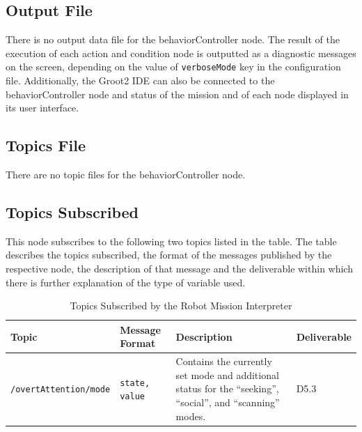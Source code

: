 \documentclass{CSSRforAfrica}
\begin{document}
\subsection{Output File}

There is no output data file for the behaviorController node. The result of the execution of each action and condition node is outputted as a diagnostic messages on the screen, depending on the value of \texttt{\small verboseMode} key in the configuration file.
Additionally, the Groot2 IDE can also be connected to the behaviorController node and status of the mission and of each node displayed in its user interface.

\subsection{Topics File}
There are no topic files for the behaviorController node.

\newpage
\subsection{Topics Subscribed}
This node subscribes to the following two topics listed in the table. The table describes the topics subscribed, the format of the messages published by the respective node, the description of that message and the deliverable within which there is further explanation of the type of variable used.

\begin{longtable}[c]{|l|p{3cm}|p{4.4cm}|l|}
    \caption{Topics Subscribed by the Robot Mission Interpreter} \label{tab:topic_messages}\\
    \hline
    \rowcolor{gray!30}
    \small{\textnormal{Topic}} & \small{\textnormal{Message Format}} & \small{\textnormal{Description}} & \small{\textnormal{Deliverable}}  \\ \hline
    \endfirsthead

    \small{\texttt{\small /overtAttention/mode}} & 
    \small{\texttt{\small state, value}} & 
    \small{Contains the currently set mode and additional status for the ``seeking'', ``social'', and ``scanning'' modes.} &
    \small{D5.3} \\ \hline

\end{longtable}
\end{document}
